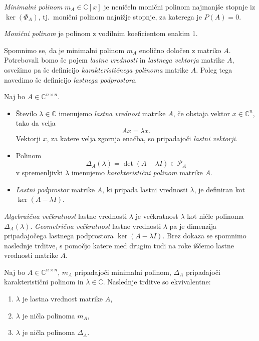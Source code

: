 \documentclass[mat1]{fmfdelo}
\newcommand{\C}{\mathbb C}
\begin{document}
\begin{definicija}
    \emph{Minimalni polinom} $m_A \in \C[x]$ je neničeln monični polinom najmanjše stopnje iz $\ker(\Phi_A)$, tj.\ monični polinom najnižje stopnje, za katerega je $P(A) = 0$.
\end{definicija}
\begin{opomba}
    \emph{Monični polinom} je polinom z vodilnim koeficientom enakim 1.
\end{opomba}
Spomnimo se, da je minimalni polinom $m_A$ enolično določen z matriko $A$. Potrebovali bomo še pojem \emph{lastne vrednosti} in \emph{lastnega vektorja} matrike $A$, osvežimo pa še definicijo \emph{karakterističnega polinoma} matrike $A$. Poleg tega navedimo še definicijo \emph{lastnega podprostora}.
\begin{definicija}
    Naj bo $A \in \C^{n \times n}$.
    \begin{itemize}
        \item Število $\lambda \in \C$ imenujemo \emph{lastna vrednost} matrike $A$, če obstaja vektor $x \in \C^n$, tako da velja
        \begin{equation}
            Ax = \lambda x.
        \end{equation}
        Vektorji $x$, za katere velja zgornja enačba, so pripadajoči \emph{lastni vektorji}.
        \item Polinom
        \begin{equation}
            \Delta_A(\lambda) = \det (A - \lambda I) \in \mathcal{P}_A
        \end{equation}
        v spremenljivki $\lambda$ imenujemo \emph{karakteristični polinom} matrike $A$.
        \item \emph{Lastni podprostor} matrike $A$, ki pripada lastni vrednosti $\lambda$, je definiran kot $\ker (A - \lambda I)$.
    \end{itemize}
\end{definicija}
\emph{Algebraična večkratnost} lastne vrednosti $\lambda$ je večkratnost $\lambda$ kot ničle polinoma $\Delta_A(\lambda)$. \emph{Geometrična večkratnost} lastne vrednosti $\lambda$ pa je dimenzija pripadajočega lastnega podprostora $\ker (A - \lambda I)$.
Brez dokaza se spomnimo naslednje trditve, s pomočjo katere med drugim tudi na roke iščemo lastne vrednosti matrike $A$.
\begin{trditev}
    Naj bo $A \in \C^{n \times n}$, $m_A$ pripadajoči minimalni polinom, $\Delta_A$ pripadajoči karakteristični polinom in $\lambda \in \C$. Naslednje trditve so ekvivalentne:
    \begin{enumerate}
        \item $\lambda$ je lastna vrednost matrike $A$,
        \item $\lambda$ je ničla polinoma $m_A$,
        \item $\lambda$ je ničla polinoma $\Delta_A$.
    \end{enumerate}
\end{trditev}
\end{document}
